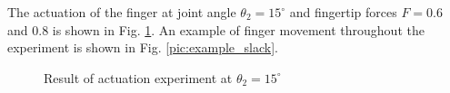 \documentclass{llncs}
\begin{document}


The actuation of the finger at joint angle $\theta_2=15^{\circ}$
and fingertip forces $F=0.6$ and $0.8$ is shown in Fig. \ref{fig:slack_conclusion}.
An example of finger movement throughout the experiment is shown in Fig. \ref{pic:example_slack}.
	\begin{figure}[tb]
	\centering
		\caption{Result of actuation experiment at $\theta_2=15^{\circ}$}
		\label{fig:slack_conclusion}
	\end{figure}
\end{document}
